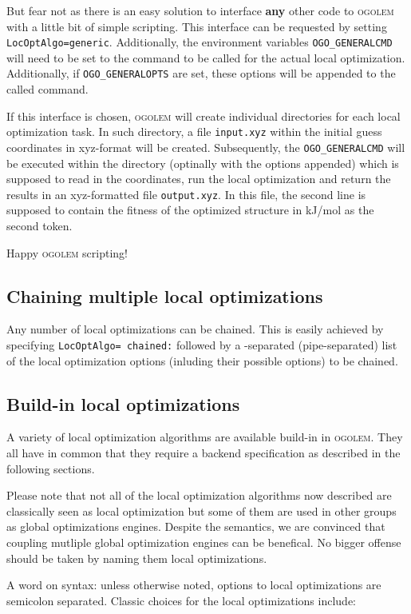 \documentclass[a4paper,10pt]{scrbook}
\newcommand{\ogo}{\textsc{ogolem}}
\begin{document}
But fear not as there is an easy solution to interface \textbf{any} other code
to \ogo{} with a little bit of simple scripting. This interface can be requested
by setting \texttt{LocOptAlgo=generic}. Additionally, the environment variables
\texttt{OGO\_GENERALCMD} will need to be set to the command to be called for the
actual local optimization. Additionally, if \texttt{OGO\_GENERALOPTS} are set, 
these
options will be appended to the called command.

If this interface is chosen, \ogo{} will create individual directories for each 
local
optimization task. In such directory, a file \texttt{input.xyz} within the 
initial guess
coordinates in xyz-format will be created. Subsequently, the 
\texttt{OGO\_GENERALCMD} will
be executed within the directory (optinally with the options appended) which is 
supposed
to read in the coordinates, run the local optimization and return the results
in an xyz-formatted file \texttt{output.xyz}. In this file, the second line is 
supposed
to contain the fitness of the optimized structure in kJ/mol as the second token.

Happy \ogo{} scripting!

\subsection{Chaining multiple local optimizations}
Any number of local optimizations can be chained. This is easily achieved by
specifying \texttt{LocOptAlgo= chained:} followed by a
\texttt{\textbar}-separated (pipe-separated) list of the local optimization
options (inluding their possible options) to be chained.

\subsection{Build-in local optimizations}
\label{sec:geomlocopt}
A variety of local optimization algorithms are available build-in in \ogo{}. 
They all have in common that they require a backend specification as described 
in the following sections.

Please note that not all of the local optimization algorithms now described are 
classically seen as local optimization but some of them are used in other 
groups as global optimizations engines. Despite the semantics, we are convinced 
that coupling mutliple global optimization engines can be benefical. No bigger 
offense should be taken by naming them local optimizations.

A word on syntax: unless otherwise noted, options to local optimizations are 
semicolon separated. Classic choices for the local optimizations include:
\end{document}
